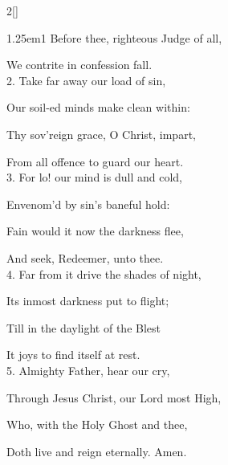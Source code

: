 \begin{paracol}{2}[]
\begin{hangparas}{1.25em}{1}
Before thee, righteous Judge of all,

We contrite in confession fall.\\

2. Take far away our load of sin,

Our soil-ed minds make clean within:

Thy sov'reign grace, O Christ, impart,

From all offence to guard our heart.\\

3. For lo! our mind is dull and cold,

Envenom'd by sin’s baneful hold:

Fain would it now the darkness flee,

And seek, Redeemer, unto thee.\\

4. Far from it drive the shades of night,

Its inmost darkness put to flight;

Till in the daylight of the Blest

It joys to find itself at rest.\\

5. Almighty Father, hear our cry,

Through Jesus Christ, our Lord most High,

Who, with the Holy Ghost and thee,

Doth live and reign eternally. Amen.
\end{hangparas}

\fussy
\end{paracol}

\clearpage
{}

